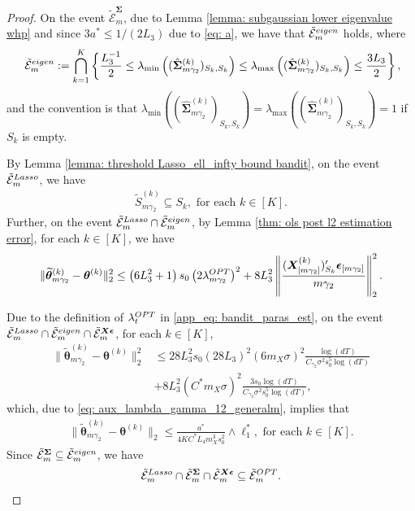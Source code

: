 \documentclass[10pt,a4paper]{amsart}
\newcommand{\bSigma}{\boldsymbol{\Sigma}}
\newcommand{\bX}{\boldsymbol{X}}
\newcommand{\bd}[1]{\boldsymbol{#1}}
\newcommand{\bepsilon}{\bd{\epsilon}}
\newcommand{\btheta}{\boldsymbol{\theta}}
\newcommand{\hbSigma}{\hat{\boldsymbol{\Sigma}}}
\newcommand{\hdlambda}{\lambda^{\textup{OPT}}}
\newcommand{\lmax}[1]{\lambda_{\max}\left(#1\right)}
\newcommand{\lmin}[1]{\lambda_{\min}\left(#1\right)}
\newcommand{\mE}{\mathcal{E}}
\newcommand{\tS}{\tilde{S}}
\newcommand{\tbtheta}{\widetilde{\boldsymbol{\theta}}}
\begin{document}
\begin{proof}
On the event $\tilde{\mE}_{m}^{\bSigma}$, due to Lemma \ref{lemma: subgaussian lower eigenvalue whp} and since $3a^* \leq 1/(2L_3)$ due to \eqref{eq: a}, we have  that $\tilde{\mE}_{m}^{\textup{eigen}}$ holds, where
\begin{equation*}
    \   \tilde{\mE}_m^{\textup{eigen}} := \bigcap_{k = 1}^{K}\left\{\frac{L_3^{-1}}{2} \le \lmin{(\hbSigma_{m\gamma_2}^{(k)})_{S_k, S_k}} \le \lmax{(\hbSigma_{m\gamma_2}^{(k)})_{S_k, S_k}} \le \frac{3L_3}{2}\right\}, 
\end{equation*}
 and the convention is that $\lmin{(\hbSigma_{m\gamma_2}^{(k)})_{S_k, S_k}} = \lmax{(\hbSigma_{m\gamma_2}^{(k)})_{S_k, S_k}} = 1$ if $S_k$ is empty.


By Lemma \ref{lemma: threshold Lasso_ell_infty bound bandit}, on the event $\tilde{\mE}_{m}^{\textup{Lasso}}$, we have
\begin{align*}
\tS_{m\gamma_2}^{(k)}  \subseteq S_k, \text{ for each } k \in [K].
\end{align*}
Further, on the event $\tilde{\mE}_{m}^{\textup{Lasso}} \cap \tilde{\mE}_{m}^{\textup{eigen}}$, by Lemma \ref{thm: ols post l2 estimation error}, for each $k \in [K]$, we have
\begin{align*}
    \|\tbtheta_{m\gamma_2}^{(k)}-\btheta^{(k)}\|_2^2 \leq \left(6L_3^2  + 1\right) s_0 \left(2\hdlambda_{m\gamma_2}\right)^2 + 8L_3^2 \left\|\frac{(\bX_{[m\gamma_2]}^{(k)})_{S_k}'\bepsilon_{[m\gamma_2]}}{m\gamma_2}\right\|_2^2.
 \end{align*}

Due to the definition of $\hdlambda_t$ in \eqref{app_eq: bandit_paras_est}, on the event $\tilde{\mE}_{m}^{\textup{Lasso}} \cap \tilde{\mE}_{m}^{\textup{eigen}} \cap \tilde{\mE}_{m}^{\bX\bepsilon}$, for each $k \in [K]$,
\begin{align*}
    \|\tbtheta_{m\gamma_2}^{(k)}-\btheta^{(k)}\|_2^2 &\leq 28L_3^2 s_0 (28L_3)^2 (6m_X \sigma)^2 \frac{\log(dT)}{C_{\gamma_2} \sigma^2 s_0^5  \log(dT)}  \\
    &+ 8L_3^2  (C^* m_X \sigma)^2 \frac{3s_0\log(dT)}{ C_{\gamma_2} \sigma^2 s_0^5  \log(dT)},
 \end{align*}
 which, due to \eqref{eq: aux_lambda_gamma_12_generalm}, implies that
 \begin{align*}
    \|\tbtheta_{m\gamma_2}^{(k)}-\btheta^{(k)}\|_2  \leq  \frac{a^*}{4KC^*L_4 m_X^3 s_0^2} \wedge  \ell_1^*, \text{ for each } k \in[K].
 \end{align*}
 Since $\tilde{\mE}_{m}^{\bSigma} \subseteq \tilde{\mE}_{m}^{\textup{eigen}}$, we have
\begin{align}\label{aux:stage3_OPT}
   \tilde{\mE}_{m}^{\textup{Lasso}} \cap \tilde{\mE}_{m}^{\bSigma}  \cap \tilde{\mE}_{m}^{\bX\bepsilon} \subseteq \tilde{\mE}_{m}^{\textup{OPT}}.
\end{align}


\end{proof}
\end{document}
